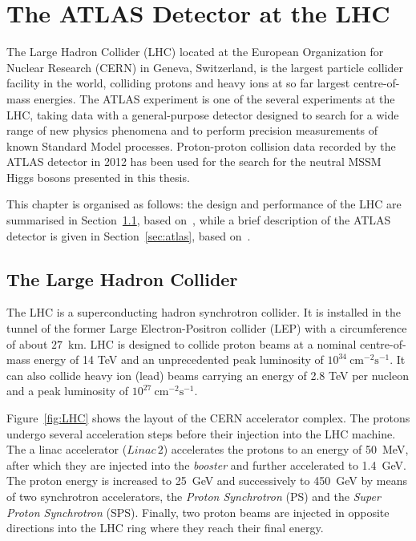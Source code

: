 \chapter{The ATLAS Detector at the LHC}\label{chap:detector}
 \vspace{0.5cm}

The Large Hadron Collider (LHC) located at the European Organization for Nuclear Research (CERN) in Geneva, Switzerland,
is  the largest particle collider facility in the world, colliding protons and heavy ions at so far largest centre-of-mass
energies. The ATLAS experiment is one of the several experiments 
at the LHC, taking data with a  general-purpose detector designed  to search for  a wide range of new 
physics phenomena and to perform  precision measurements of known Standard Model processes.
Proton-proton collision data recorded by the ATLAS detector in 2012  has been used for 
the search for the neutral MSSM Higgs bosons presented in this thesis.

This chapter is organised as follows: the design and performance of the LHC  are summarised in 
Section~\ref{sec:lhc}, based on~\cite{LHC},  while  a brief description of the 
 ATLAS detector  is given in Section~\ref{sec:atlas}, based on~\cite{ATLASDetector}.


\restoregeometry
\clearpage



\section{The Large Hadron Collider}\label{sec:lhc}
The LHC is a superconducting hadron synchrotron  collider. It is  installed in the tunnel of the former Large Electron-Positron collider (LEP)
with a circumference of about $27$~km.
LHC is designed to collide proton beams at a nominal centre-of-mass energy of 14 TeV and an unprecedented peak luminosity of 
$10^{34} ~ \text{cm}^{-2} \text{s}^{-1}$. It can also collide heavy ion (lead) beams carrying  an energy of 2.8 TeV per nucleon and 
a peak luminosity of $10^{27} ~ \text{cm}^{-2} \text{s}^{-1}$. 

Figure~\ref{fig:LHC} shows the layout of the CERN accelerator complex. The  protons undergo several acceleration steps before 
their injection into the LHC machine.
The a linac accelerator ($Linac\,2$) accelerates the protons to an energy of 50~MeV, after which
they are injected into the \emph{booster} and further  accelerated
to 1.4~GeV. The proton energy is increased to 25~GeV and successively to 450~GeV by means of two synchrotron accelerators, the \emph{Proton Synchrotron} (PS)
and the \emph{Super Proton Synchrotron} (SPS). Finally, two proton beams are  injected in opposite directions into the LHC ring
where they reach their final energy.

